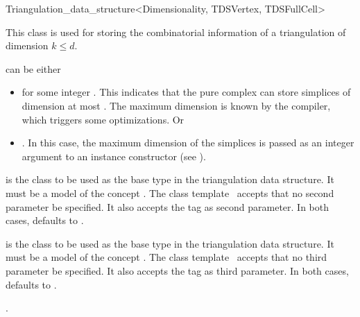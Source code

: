 \begin{ccRefClass}{Triangulation_data_structure<Dimensionality, TDSVertex, TDSFullCell>}

\ccDefinition 
This class is used for storing the combinatorial information of a triangulation
of dimension $k\leq d$.


\ccParameters

 can be either \begin{itemize}

\item \ccPureGlobalScope{} for some integer . This
indicates that the pure complex can store simplices of dimension at most
. The maximum dimension  is known by the compiler, which
triggers some optimizations. Or

\item \ccPureGlobalScope{}. In this case, the maximum
dimension of the simplices is passed as an integer argument to an instance
constructor (see ).\end{itemize}

 is the class to be used as the base  type in the
triangulation data structure. It must be a model of the concept
. The class template \ccRefName\ accepts that no
second parameter be specified. It also accepts the tag  as
second parameter. In both cases,  defaults to
.


 is the class to be used as the base  type in
the triangulation data structure. It must be a model of the concept
. The class template \ccRefName\ accepts that no
third parameter be specified. It also accepts the tag  as
third parameter. In both cases,  defaults to
.

\ccIsModel

.

\end{ccRefClass}
